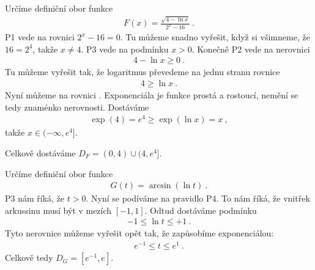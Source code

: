 \begin{example}
    Určíme definiční obor funkce \begin{align}
        F(x) = \frac{\sqrt{4-\ln x}}{2^x - 16} \:.
    \end{align}
    P1 vede na rovnici $2^x - 16 = 0$. Tu můžeme snadno vyřešit, když si všimneme, že $16 = 2^4$, takže $x \neq 4$.
    P3 vede na podmínku $x>0$. Konečně P2 vede na nerovnici \begin{align}
        4 - \ln x \geq 0 \:.
    \end{align}
    Tu můžeme vyřešit tak, že logaritmus převedeme na jednu stranu rovnice
    \begin{align}
        4 \geq \ln x \:.
    \end{align}
    Nyní můžeme na rovnici . Exponenciála je funkce prostá a rostoucí, nemění se tedy znaménko nerovnosti. Dostáváme \begin{align}
        \exp(4) = e^4 \geq \exp(\ln x) = x \:,
    \end{align}
    takže $x \in (-\infty, e^4]$.
    
    Celkově dostáváme $D_F = (0,4)\cup(4,e^4]$.
\end{example}

\begin{example}
    Určíme definiční obor funkce \begin{align}
        G(t) = \arcsin (\ln t) \:.
    \end{align}
    P3 nám říká, že $t>0$. Nyní se podíváme na pravidlo P4. To nám říká, že vnitřek arkussinu musí být v mezích $[-1,1]$. Odtud dostáváme podmínku \begin{align}
        -1 \leq \ln t \leq +1 \:.
    \end{align}
    Tyto nerovnice můžeme vyřešit opět tak, že zapůsobíme exponenciálou:
    \begin{align}
        e^{-1} \leq t \leq e^1 \:.
    \end{align}
    Celkově tedy $D_G = [e^{-1},e]$.
\end{example}

